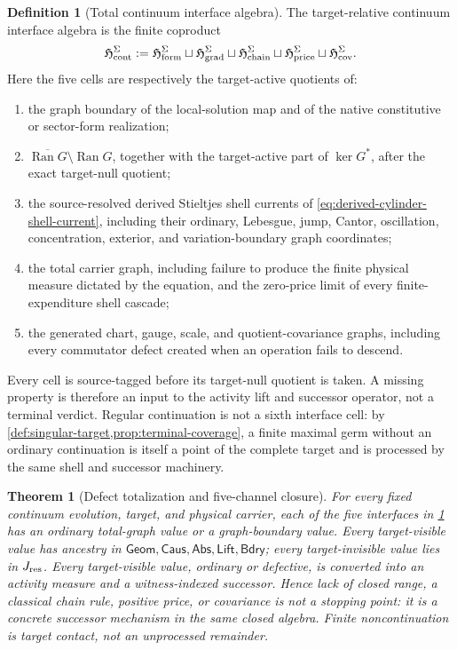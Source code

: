 \documentclass[11pt]{article}
\numberwithin{section}{part}
\theoremstyle{plain}
\newtheorem{theorem}{Theorem}[section]
\theoremstyle{definition}
\newtheorem{definition}[definition]{Definition}
\theoremstyle{remark}
\newcommand{\Geom}{\mathsf{Geom}}
\newcommand{\Caus}{\mathsf{Caus}}
\newcommand{\Abs}{\mathsf{Abs}}
\newcommand{\Lift}{\mathsf{Lift}}
\newcommand{\Bdry}{\mathsf{Bdry}}
\newcommand{\Ran}{\operatorname{Ran}}
\begin{document}
\begin{definition}[Total continuum interface algebra]
\label{def:continuum-obstruction-algebra}
The target-relative continuum interface algebra is the finite coproduct
\begin{equation}
 \label{eq:continuum-obstruction-algebra}
 \mathfrak H_{\rm cont}^\Sigma
 :=\mathfrak H_{\rm form}^\Sigma
 \sqcup\mathfrak H_{\rm grad}^\Sigma
 \sqcup\mathfrak H_{\rm chain}^\Sigma
 \sqcup\mathfrak H_{\rm price}^\Sigma
 \sqcup\mathfrak H_{\rm cov}^\Sigma .
\end{equation}
Here the five cells are respectively the target-active quotients of:
\begin{enumerate}[label=\textup{(D\arabic*)}]
\item the graph boundary of the local-solution map and of the native
constitutive or sector-form realization;
\item \(\overline{\Ran G}\setminus\Ran G\), together with the target-active
part of \(\ker G^*\), after the exact target-null quotient;
\item the source-resolved derived Stieltjes shell currents of
\eqref{eq:derived-cylinder-shell-current}, including their ordinary,
Lebesgue, jump, Cantor, oscillation, concentration, exterior, and
variation-boundary graph coordinates;
\item the total carrier graph, including failure to produce the finite physical
measure dictated by the equation, and the zero-price limit of every
finite-expenditure shell cascade;
\item the generated chart, gauge, scale, and quotient-covariance graphs,
including every commutator defect created when an operation fails to descend.
\end{enumerate}
Every cell is source-tagged before its target-null quotient is taken.  A
missing property is therefore an input to the activity lift and successor
operator, not a terminal verdict.  Regular continuation is not a sixth
interface cell: by \cref{def:singular-target,prop:terminal-coverage}, a finite
maximal germ without an ordinary continuation is itself a point of the
complete target and is processed by the same shell and successor machinery.
\end{definition}

\begin{theorem}[Defect totalization and five-channel closure]
\label{thm:defect-totalization-five-channel}
For every fixed continuum evolution, target, and physical carrier, each of
the five interfaces in \cref{def:continuum-obstruction-algebra} has an
ordinary total-graph value or a graph-boundary value.  Every target-visible
value has ancestry in \(\Geom,\Caus,\Abs,\Lift,\Bdry\); every
target-invisible value lies in \(J_{\rm res}\).  Every target-visible value,
ordinary or defective, is converted into an activity measure and a
witness-indexed successor.  Hence lack of closed range, a classical chain
rule, positive price, or covariance is not a stopping point: it is
a concrete successor mechanism in the same closed algebra.  Finite
noncontinuation is target contact, not an unprocessed remainder.
\end{theorem}
\end{document}
